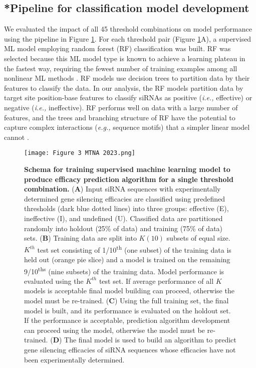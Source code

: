 \documentclass{report}
\begin{document}
\subsection{*Pipeline for classification model development}
We evaluated the impact of all 45 threshold combinations on model performance using the pipeline in Figure \ref{fig:Figure* 3}. For each threshold pair (Figure \ref{fig:Figure* 3}A), a supervised ML model employing random forest (RF) classification was built. RF was selected because this ML model type is known to achieve a learning plateau in the fastest way, requiring the fewest number of training examples among all nonlinear ML methods \cite{fernandez-delgado_we_2014}. RF models use decision trees to partition data by their features to classify the data. In our analysis, the RF models partition data by target site position-base features to classify siRNAs as positive (\textit{i.e., }effective) or negative (\textit{i.e., }ineffective). RF performs well on data with a large number of features, and the trees and branching structure of RF have the potential to capture complex interactions (\textit{e.g.,} sequence motifs) that a simpler linear model cannot \cite{breiman_random_2001}.

\begin{figure}
    \centering
    \texttt{[image: Figure 3 MTNA 2023.png]}
    \caption{\textbf{Schema for training supervised machine learning model to produce efficacy prediction algorithm for a single threshold combination.} (\textbf{A}) Input siRNA sequences with experimentally determined gene silencing efficacies are classified using predefined thresholds (dark blue dotted lines) into three groups: effective (E), ineffective (I), and undefined (U). Classified data are partitioned randomly into holdout (25\% of data) and training (75\% of data) sets. (\textbf{B}) Training data are split into $K (10)$ subsets of equal size. $K^{th}$ test set consisting of 1/10\textsuperscript{th} (one subset) of the training data is held out (orange pie slice) and a model is trained on the remaining 9/10\textsuperscript{ths} (nine subsets) of the training data. Model performance is evaluated using the $K^{th}$ test set. If average performance of all $K$ models is acceptable final model building can proceed, otherwise the model must be re-trained. (\textbf{C}) Using the full training set, the final model is built, and its performance is evaluated on the holdout set. If the performance is acceptable, prediction algorithm development can proceed using the model, otherwise the model must be re-trained. (\textbf{D}) The final model is used to build an algorithm to predict gene silencing efficacies of siRNA sequences whose efficacies have not been experimentally determined. 
}
    \label{fig:Figure* 3}
\end{figure}
\end{document}
